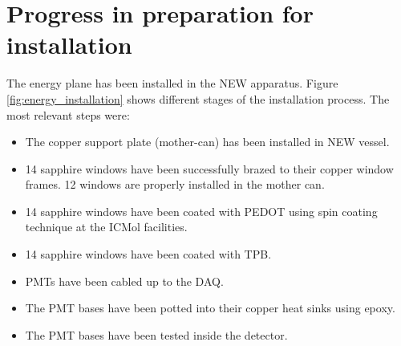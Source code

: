 \section{Progress in preparation for installation}
\label{sec:EPProg}

The energy plane has been installed in the NEW apparatus. Figure \ref{fig:energy_installation} shows different stages of the installation process. The most relevant steps were:
\begin{itemize}
\item The copper support plate (mother-can) has been installed in NEW vessel.
\item 14 sapphire windows have been successfully brazed to their copper window frames. 12 windows are properly installed in the mother can.
\item 14 sapphire windows have been coated with PEDOT using spin coating technique at the ICMol facilities.
\item 14 sapphire windows have been coated with TPB.
\item PMTs have been cabled up to the DAQ.
\item The PMT bases have been potted into their copper heat sinks using epoxy.
\item The PMT bases have been tested inside the detector.
\end{itemize}


